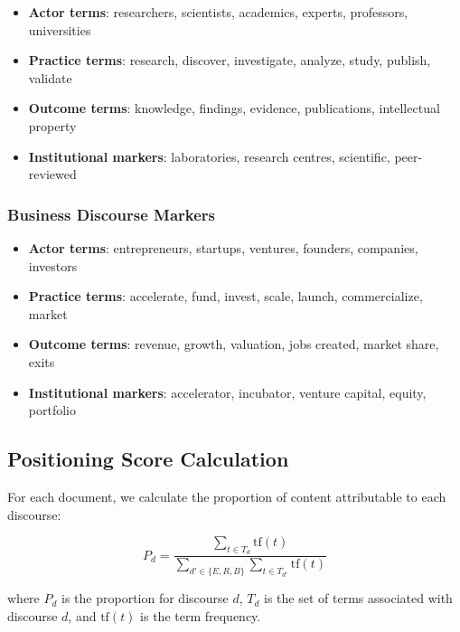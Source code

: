 \documentclass[../main.tex]{subfiles}
\begin{document}
\begin{itemize}
    \item \textbf{Actor terms}: researchers, scientists, academics, experts, professors, universities
    \item \textbf{Practice terms}: research, discover, investigate, analyze, study, publish, validate
    \item \textbf{Outcome terms}: knowledge, findings, evidence, publications, intellectual property
    \item \textbf{Institutional markers}: laboratories, research centres, scientific, peer-reviewed
\end{itemize}

\subsubsection{Business Discourse Markers}

\begin{itemize}
    \item \textbf{Actor terms}: entrepreneurs, startups, ventures, founders, companies, investors
    \item \textbf{Practice terms}: accelerate, fund, invest, scale, launch, commercialize, market
    \item \textbf{Outcome terms}: revenue, growth, valuation, jobs created, market share, exits
    \item \textbf{Institutional markers}: accelerator, incubator, venture capital, equity, portfolio
\end{itemize}

\subsection{Positioning Score Calculation}

For each document, we calculate the proportion of content attributable to each discourse:

\begin{equation}
    P_d = \frac{\sum_{t \in T_d} \text{tf}(t)}{\sum_{d' \in \{E,R,B\}} \sum_{t \in T_{d'}} \text{tf}(t)}
\end{equation}

where $P_d$ is the proportion for discourse $d$, $T_d$ is the set of terms associated with discourse $d$, and $\text{tf}(t)$ is the term frequency.
\end{document}
